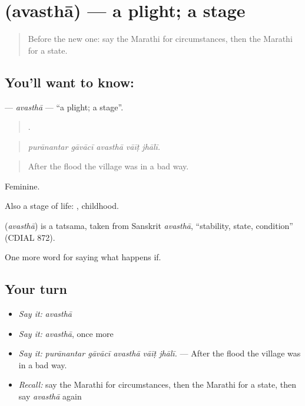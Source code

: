 \section[\texorpdfstring{\mr{अवस्था} (avasthā)}{अवस्था (avasthā)}]{ (avasthā) — a plight; a stage}

\label{lesson:MR-C384-avastha}



\begin{quote}
Before the new one: say the Marathi for circumstances, then the Marathi for a state.
\end{quote}

\subsection*{You'll want to know: }
\textbf{} — \emph{avasthā} — \textquotedblleft{}a plight; a stage\textquotedblright{}.

\begin{quote}
    .
\end{quote}

\begin{quote}
\emph{purānantar gāvācī avasthā vāīṭ jhālī.}
\end{quote}

\begin{quote}
After the flood the village was in a bad way.
\end{quote}

Feminine.

Also a stage of life: , childhood.

\begin{cousinweb}
\textbf{} (\emph{avasthā}) is a tatsama, taken from Sanskrit \emph{avasthā}, \textquotedblleft{}stability, state, condition\textquotedblright{} (CDIAL 872).
\end{cousinweb}

\begin{grammarlens}[title={What you've built}]
One more word for saying what happens if.
\end{grammarlens}

\subsection*{Your turn}
\begin{itemize}
\raggedright
  \item \emph{Say it:} \emph{avasthā}
  \item \emph{Say it:} \emph{avasthā}, once more
  \item \emph{Say it:} \emph{purānantar gāvācī avasthā vāīṭ jhālī.} — After the flood the village was in a bad way.
  \item \emph{Recall:} say the Marathi for circumstances, then the Marathi for a state, then say \emph{avasthā} again
\end{itemize}

